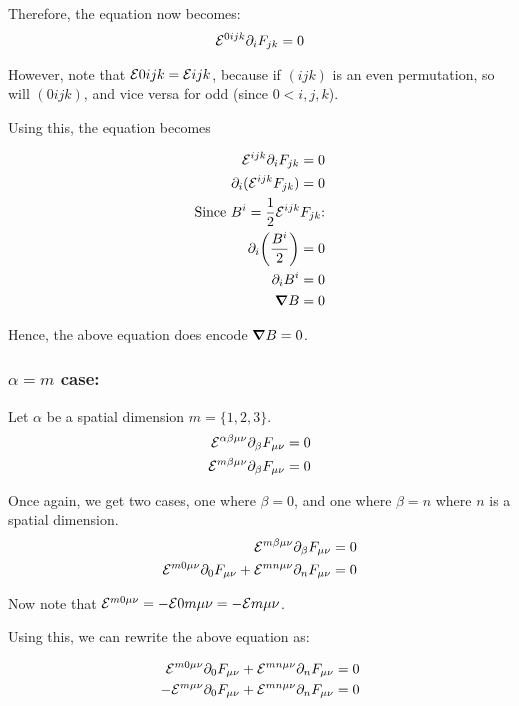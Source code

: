 Therefore, the equation now becomes:
\begin{align*}
    \mathcal{E}^{0 i j k}  \partial_{i} F_{j k} = 0
\end{align*}

However, note that $\mathcal{E}{0 i j k} = \mathcal{E}{i j k}$, because if
$(i j k)$ is an even permutation, so will $(0 i j k)$, and vice versa for odd
(since $0 < i, j, k$).

Using this, the equation becomes

\begin{align*}
    \mathcal{E}^{i j k}  \partial_{i} F_{j k} = 0 \\
    \partial_{i} ( \mathcal{E}^{i j k} F_{j k}) = 0 \\
    \text{Since $B^i = \frac{1}{2} \mathcal{E}^{ijk} F_{j k}$:} \\
    \partial_{i} \bigg( \frac{B^i}{2} \bigg) = 0 \\
    \partial_{i}  B^i = 0 \\
    \grad B = 0
\end{align*}

Hence, the above equation does encode $\grad B = 0$.

\subsubsection{$\alpha = m$ case:}
Let $\alpha$ be a spatial dimension $m = \{ 1, 2, 3 \}$.
\begin{align*}
    \mathcal{E}^{\alpha \beta \mu \nu}  \partial_{\beta} F_{\mu \nu} = 0 \\
    \mathcal{E}^{m \beta \mu \nu}  \partial_{\beta} F_{\mu \nu} = 0
\end{align*}

Once again, we get two cases, one where $\beta = 0$, and one where $\beta = n$
where $n$ is a spatial dimension.
\begin{align*}
    \mathcal{E}^{m \beta \mu \nu}  \partial_{\beta} F_{\mu \nu} = 0 \\
    \mathcal{E}^{m 0 \mu \nu}  \partial_{0} F_{\mu \nu} + \mathcal{E}^{m n \mu \nu}  \partial_{n} F_{\mu \nu}  = 0 \\
\end{align*}

Now note that $\mathcal{E}^{m 0 \mu \nu} = - \mathcal{E}{0 m \mu \nu} = - \mathcal{E}{m \mu \nu}$.

Using this, we can rewrite the above equation as:

\begin{align*}
    \mathcal{E}^{m 0 \mu \nu}  \partial_{0} F_{\mu \nu} + \mathcal{E}^{m n \mu \nu}  \partial_{n} F_{\mu \nu}  = 0 \\
    - \mathcal{E}^{m \mu \nu}  \partial_{0} F_{\mu \nu} + \mathcal{E}^{m n \mu \nu}  \partial_{n} F_{\mu \nu}  = 0 \\
\end{align*}

